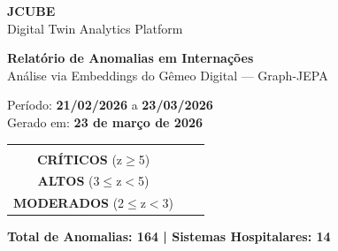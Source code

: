 \documentclass[a4paper,10pt]{article}
\begin{document}
\setlength{\parindent}{0pt}
\setlength{\parskip}{3pt}

\begin{titlepage}
\begin{center}
\vspace*{1.5cm}
{\Huge\bfseries\textcolor{jcubeblue}{JCUBE}}\\[0.2cm]
{\large\textcolor{jcubegray}{Digital Twin Analytics Platform}}\\[1.2cm]
\begin{tcolorbox}[colback=jcubeblue,colframe=jcubeblue,coltext=white,width=0.92\textwidth,halign=center]
{\LARGE\bfseries Relat\'{o}rio de Anomalias em Interna\c{c}\~{o}es}\\[0.3cm]
{\large An\'{a}lise via Embeddings do G\^{e}meo Digital --- Graph-JEPA}
\end{tcolorbox}
\vspace{0.8cm}

{\Large Per\'{i}odo: \textbf{21/02/2026} a \textbf{23/03/2026}}\\[0.4cm]
{\large Gerado em: \textbf{23 de mar\c{c}o de 2026}}\\[1.5cm]
\begin{tabular}{ccc}
\begin{tcolorbox}[colback=anomred!10,colframe=anomred,width=3.8cm,halign=center,left=3pt,right=3pt]
{\LARGE\bfseries\textcolor{anomred}{7}}\\[2pt]
{\small\textbf{CR\'ITICOS} (z$\geq$5)}
\end{tcolorbox}
&
\begin{tcolorbox}[colback=anomorange!10,colframe=anomorange,width=3.8cm,halign=center,left=3pt,right=3pt]
{\LARGE\bfseries\textcolor{anomorange}{31}}\\[2pt]
{\small\textbf{ALTOS} (3$\leq$z$<$5)}
\end{tcolorbox}
&
\begin{tcolorbox}[colback=anomyellow!10,colframe=anomyellow,width=3.8cm,halign=center,left=3pt,right=3pt]
{\LARGE\bfseries\textcolor{anomyellow}{126}}\\[2pt]
{\small\textbf{MODERADOS} (2$\leq$z$<$3)}
\end{tcolorbox}
\end{tabular}

\vspace{0.6cm}
\begin{tcolorbox}[colback=lightblue,colframe=jcubeblue,width=0.85\textwidth,halign=center]
{\large\bfseries Total de Anomalias: 164 \quad | \quad Sistemas Hospitalares: 14}\\[4pt]


\end{tcolorbox}
\end{center}
\end{titlepage}
\end{document}
